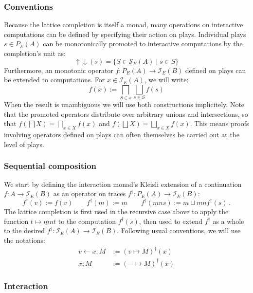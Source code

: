 \documentclass[format=sigplan,authordraft]{acmart}
\begin{document}
\subsubsection{Conventions}

Because the lattice completion is itself a monad,
many operations on interactive computations
can be defined by specifying their action on plays.
Individual plays $s \in P_E(A)$ can be monotonically promoted to
interactive computations by the completion's unit as:
\[
    {\uparrow \downarrow}(s) =
      \{ S \in \mathcal{S}_E(A) \mid s \in S \}
\]
Furthermore,
an monotonic operator $f : P_E(A) \rightarrow \mathcal{I}_E(B)$
defined on plays can be extended to computations.
For $x \in \mathcal{I}_E(A)$, we will write:
\[
  f(x) := \bigsqcap_{S \in x} \bigsqcup_{s \in S} f(s)
\]
When the result is unambiguous we will use both constructions
implicitely.
Note that the promoted operators
distribute over arbitrary unions and intersections, so that
$f(\bigsqcap X) = \bigsqcap_{x \in X} f(x)$ and
$f(\bigsqcup X) = \bigsqcup_{x \in X} f(x)$.
This means proofs involving operators defined on plays
can often themselves be carried out at the level of plays.

\subsubsection{Sequential composition}

We start by defining the interaction monad's Kleisli extension
of a continuation $f : A \rightarrow \mathcal{I}_E(B)$
as an operator on traces
$f^\dagger : P_E(A) \rightarrow \mathcal{I}_E(B)$:
\[
  f^\dagger(v) := f(v) \qquad
  f^\dagger(\underline{m}) := \underline{m} \qquad
  f^\dagger(\underline{m} n s) :=
    \underline{m} \sqcup \underline{m} n f^\dagger(s) \,.
\]
The lattice completion is first used in the recursive case above
to apply the function $t \mapsto \underline{m} n t$
to the computation $f^\dagger(s)$,
then used to extend $f^\dagger$ as a whole to the desired
$f^\dagger : \mathcal{I}_E(A) \rightarrow \mathcal{I}_E(B)$.
Following usual conventions, we will use the notations:
\begin{align*}
  v \leftarrow x ; M &:= (v \mapsto M)^\dagger(x) \\
  x ; M &:= ({-} \mapsto M)^\dagger(x)
\end{align*}

\subsubsection{Interaction}
\end{document}
